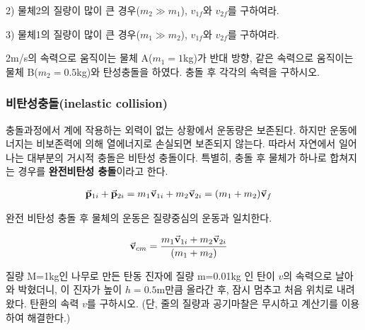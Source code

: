 \begin{flushleft}
\begin{task}[탄성충돌]
\begin{flushleft}
  2) 물체2의 질량이 많이 큰 경우($m_2 \gg m_1$), $v_{1f}$와 $v_{2f}$를 구하여라. \\
  \indent

  3) 물체1의 질량이 많이 큰 경우($m_1 \gg m_2$), $v_{1f}$와 $v_{2f}$를 구하여라. 

\end{flushleft}
\end{task}

\begin{task}
  \begin{flushleft}
  2m/s의 속력으로 움직이는 물체 A($m_1=1$kg)가 반대 방향, 같은 속력으로 움직이는 물체 B($m_2=0.5$kg)와 탄성충돌을 하였다.
  충돌 후 각각의 속력을 구하시오.\\
\end{flushleft}
\end{task}

\subsubsection{비탄성충돌(inelastic collision)}
충돌과정에서 계에 작용하는 외력이 없는 상황에서 운동량은 보존된다. 하지만 운동에너지는 비보존력에 의해 열에너지로 손실되면
보존되지 않는다. 따라서 자연에서 일어나는 대부분의 거시적 충돌은 비탄성 충돌이다. 특별히, 
충돌 후 물체가 하나로 합쳐지는 경우를
\textbf{완전비탄성 충돌}이라고 한다. 

\[
\begin{split} 
   &\va{p}_{1i}+\va{p}_{2i} =m_1\va{v}_{1i}+m_2\va{v}_{2i}=(m_1+m_2)\va{v}_f 
\end{split}
\]

완전 비탄성 충돌 후 물체의 운동은 질량중심의 운동과 일치한다.

\[
\begin{split} 
   &\va{v}_{cm}=\frac{m_1\va{v}_{1i}+m_2\va{v}_{2i}}{(m_1+m_2)}
\end{split}
\]


\begin{task}
  \begin{flushleft}
  질량 M=1kg인 나무로 만든 탄동 진자에 질량 m=0.01kg 인 탄이 $v$의 속력으로 날아와 박혔더니, 이 진자가 높이 $h=0.5$m만큼 올라간
  후, 잠시 멈추고 처음 위치로 내려왔다. 탄환의 속력 $v$를 구하시오. (단, 줄의 질량과 공기마찰은 무시하고 
  계산기를 이용하여 해결한다.)
\end{flushleft}
\end{task}


\end{flushleft}
